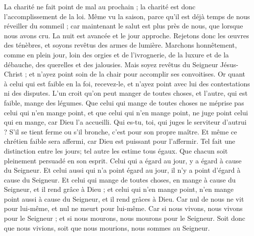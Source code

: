 \begin{multicols}{2}
La charité ne fait point de mal au prochain ; la charité est donc l'accomplissement de la loi.
Même vu la saison, parce qu'il est déjà temps de nous réveiller du sommeil ; car maintenant le salut est plus près de nous, que lorsque nous avons cru.
La nuit est avancée et le jour approche. Rejetons donc les œuvres des ténèbres, et soyons revêtus des armes de lumière.
Marchons honnêtement, comme en plein jour, loin des orgies et de l'ivrognerie, de la luxure et de la débauche, des querelles et des jalousies.
Mais soyez revêtus du Seigneur Jésus-Christ ; et n'ayez point soin de la chair pour accomplir ses convoitises.
\VerseOne{}Or quant à celui qui est faible en la foi, recevez-le, et n'ayez point avec lui des contestations ni des disputes.
L'un croit qu'on peut manger de toutes choses, et l'autre, qui est faible, mange des légumes.
Que celui qui mange de toutes choses ne méprise pas celui qui n'en mange point, et que celui qui n'en mange point, ne juge point celui qui en mange, car Dieu l'a accueilli.
Qui es-tu, toi, qui juges le serviteur d'autrui ? S'il se tient ferme ou s'il bronche, c'est pour son propre maître. Et même ce chrétien faible sera affermi, car Dieu est puissant pour l'affermir.
Tel fait une distinction entre les jours; tel autre les estime tous égaux. Que chacun soit pleinement persuadé en son esprit.
Celui qui a égard au jour, y a égard à cause du Seigneur. Et celui aussi qui n'a point égard au jour, il n'y a point d'égard à cause du Seigneur. Et celui qui mange de toutes choses, en mange à cause du Seigneur, et il rend grâce à Dieu ; et celui qui n'en mange point, n'en mange point aussi à cause du Seigneur, et il rend grâces à Dieu.
Car nul de nous ne vit pour lui-même, et nul ne meurt pour lui-même.
Car si nous vivons, nous vivons pour le Seigneur ; et si nous mourons, nous mourons pour le Seigneur. Soit donc que nous vivions, soit que nous mourions, nous sommes au Seigneur.

\end{multicols}
